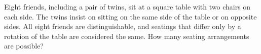 Eight friends, including a pair of twins, sit at a square table with two chairs on each side. The twins insist on sitting on the same side of the table or on opposite sides. All eight friends are distinguishable, and seatings that differ only by a rotation of the table are considered the same. How many seating arrangements are possible?
